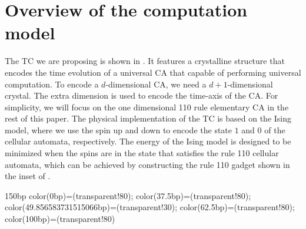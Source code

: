 \documentclass[twocolumn,superscriptaddress,english,showpacs,longbibliography]{revtex4-2}
\begin{document}




\section{Overview of the computation model}\label{sec:Overview-of-main-results}
The TC we are proposing is shown in . It features a crystalline structure that encodes the time evolution of a universal CA that capable of performing universal computation.
To encode a $d$-dimensional CA, we need a $d+1$-dimensional crystal. The extra dimension is used to encode the time-axis of the CA.
For simplicity, we will focus on the one dimensional 110 rule elementary CA in the rest of this paper.
The physical implementation of the TC is based on the Ising model, where we use the spin up and down to encode the state $1$ and $0$ of the cellular automata, respectively. The energy of the Ising model is designed to be minimized when the spins are in the state that satisfies the rule 110 cellular automata, which can be achieved by constructing the rule 110 gadget shown in the inset of .

 {150bp} {color(0bp)=(transparent!80);
color(37.5bp)=(transparent!80);
color(49.856583731515066bp)=(transparent!30);
color(62.5bp)=(transparent!80);
color(100bp)=(transparent!80) } 
\end{document}
